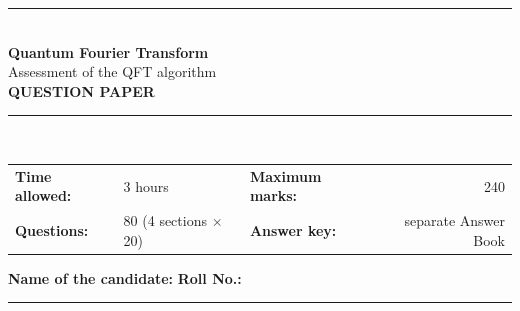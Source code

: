 \documentclass[11pt,a4paper]{article}
\begin{document}
\pagestyle{fancy}\fancyhf{}
\renewcommand{\headrulewidth}{0.4pt}

\thispagestyle{empty}
\begin{center}
{\color{brand}\rule{\linewidth}{1.2pt}}\\[6pt]
{\Huge\bfseries\color{brand} Quantum Fourier Transform}\\[4pt]
{\Large Assessment of the QFT algorithm}\\[4pt]
{\large\bfseries QUESTION PAPER}\\[2pt]
{\color{brand}\rule{\linewidth}{1.2pt}}\\[1pt]
\end{center}
\vspace{-2pt}
\begin{tabularx}{\linewidth}{@{}lXlr@{}}
\textbf{Time allowed:} & 3 hours & \textbf{Maximum marks:} & 240\\
\textbf{Questions:} & 80 (4 sections $\times$ 20) & \textbf{Answer key:} & separate Answer Book
\end{tabularx}
\vspace{6pt}

\textbf{Name of the candidate:} \hrulefill\quad \textbf{Roll No.:} \rule{35mm}{0.4pt}
\end{document}
